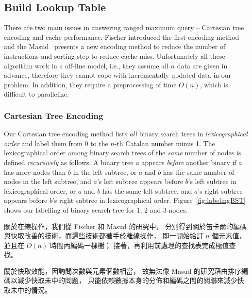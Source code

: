%

\subsection{Build Lookup Table}

There are two main issues in answering ranged maximum query --
Cartesian tree encoding and cache performance.  Fischer introduced the
first encoding method and the Masud~\cite{Hasan2010CacheOA} presents a
new encoding method to reduce the number of instructions and sorting
step to reduce cache miss.  Unfortunately all these algorithm work in
a off-line model, i.e., they assume all $n$ data are given in advance,
therefore they cannot cope with incrementally updated data in our
problem.  In addition, they require a preprocessing of time $O(n)$,
which is difficult to parallelize.


\subsubsection{Cartesian Tree Encoding}

Our Cartesian tree encoding method lists {\em all} binary search trees
in {\em lexicographical order} and label them from $0$ to the $n$-th
Catalan number minus 1.  The lexicographical order among binary search
trees of the {\em same} number of nodes is defined {\em recursively}
as follows.  A binary tree $a$ appears {\em before} another binary if
$a$ has more nodes than $b$ in the left subtree, or $a$ and $b$ has
the same number of nodes in the left subtree, and $a$'s left subtree
appears before $b$'s left subtree in lexicographical order, or $a$ and
$b$ has the same left subtree, and $a$'s right subtree appears before
$b$'s right subtree in lexicographical order.
Figure~\ref{fig:labelingBST} shows our labelling of binary search tree
for 1, 2 and 3 nodes.

\iffalse
關於在線操作，我們從 Fischer \cite{fischer} 和 Masud \cite{masud} 的研究中，
分別得到關於笛卡爾的編碼與快取改善的技術，而這些技術都著手於離線操作，
即一開始給訂 $n$ 個元素值，並且在 $O(n)$ 時間內編碼一棵樹；
接著，再利用前處理的查找表完成極值查找。

關於快取效能，因詢問次數與元素個數相當，
故無法像 Masud \cite{masud} 的研究藉由排序編碼以減少快取未中的問題，
只能依賴數據本身的分佈和編碼之間的關聯來減少快取未中的情況。

